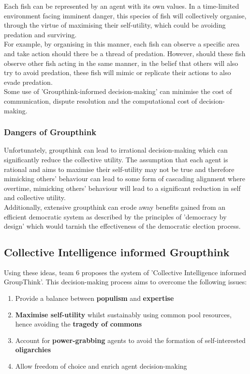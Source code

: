 Each fish can be represented by an agent with its own values. In a time-limited environment facing imminent danger, this species of fish will collectively organise, through the virtue of maximising their self-utility, which could be avoiding predation and surviving.\\

For example, by organising in this manner, each fish can observe a specific area and take action should there be a thread of predation. However, should these fish observe other fish acting in the same manner, in the belief that others will also try to avoid predation, these fish will mimic or replicate their actions to also evade predation. \\

Some use of 'Groupthink-informed decision-making' can minimise the cost of communication, dispute resolution and the computational cost of decision-making. 

\subsubsection{Dangers of Groupthink}

Unfortunately, groupthink can lead to irrational decision-making which can significantly reduce the collective utility. The assumption that each agent is rational and aims to maximise their self-utility may not be true and therefore mimicking others' behaviour can lead to some form of cascading alignment where overtime, mimicking others' behaviour will lead to a significant reduction in self and collective utility. \\

Additionally, extensive groupthink can erode away benefits gained from an efficient democratic system as described by the principles of 'democracy by design' which would tarnish the effectiveness of the democratic election process.

\subsection{Collective Intelligence informed Groupthink}

Using these ideas, team 6 proposes the system of 'Collective Intelligence informed GroupThink'.  This decision-making process aims to overcome the following issues:

\begin{enumerate}
  \item Provide a balance between \textbf{populism} and \textbf{expertise}
  \item\textbf{Maximise self-utility} whilst sustainably using common pool resources, hence avoiding the \textbf{tragedy of commons}
  \item Account for \textbf{power-grabbing} agents to avoid the formation of self-interested \textbf{oligarchies}
  \item Allow freedom of choice and enrich agent decision-making
\end{enumerate}

